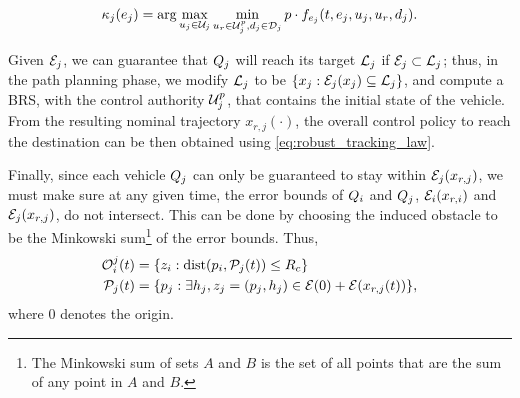 \begin{equation}
\label{eq:robust_tracking_law}
\tracklaw_j(e_j) = \arg\max_{u_j \in \cset_j} \min_{u_r \in\cset^p_j, d_j \in \dset_j} p \cdot f_{e_j}(t,e_j,u_j,u_r,d_j).
\end{equation}

Given $\mathcal{E}_j$, we can guarantee that $Q_{j}$ will reach its target $\mathcal{L}_j$ if $\mathcal{E}_j \subset \mathcal{L}_j$; thus, in the path planning phase, we modify $\mathcal{L}_j$ to be $\{x_j: \mathcal{E}_j(x_j) \subseteq \mathcal{L}_j\}$, and compute a BRS, with the control authority $\mathcal{U}^p_j$, that contains the initial state of the vehicle. From the resulting nominal trajectory $x_{r,j}(\cdot)$, the overall control policy to reach the destination can be then obtained using \eqref{eq:robust_tracking_law}.

Finally, since each vehicle $Q_{j}$ can only be guaranteed to stay within $\mathcal{E}_j(x_{r,j})$, we must make sure at any given time, the error bounds of $Q_{i}$ and $Q_{j}$, $\mathcal{E}_i(x_{r,i})$ and $\mathcal{E}_j(x_{r,j})$, do not intersect. This can be done by choosing the induced obstacle to be the Minkowski sum\footnote{The Minkowski sum of sets $A$ and $B$ is the set of all points that are the sum of any point in $A$ and $B$.} of the error bounds. Thus,
\vspace{-0.3em}
\begin{equation}
\begin{aligned}
\mathcal{O}_i^j(t) &= \{z_i: \text{dist}(p_i, \mathcal{P}_j(t)) \le R_c \} \\
\mathcal{P}_j(t) &= \{p_j: \exists h_j, z_j = (p_j, h_j) \in \mathcal{E}(0) + \mathcal{E}(x_{r,j}(t)) \},
\end{aligned}
\end{equation}
\noindent where $0$ denotes the origin. 
